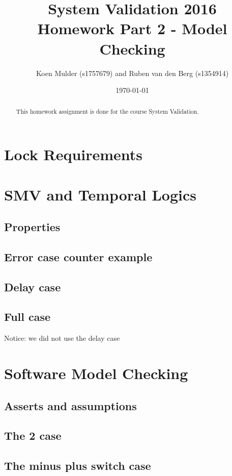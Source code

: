 \documentclass[a4paper]{article}
\title{System Validation 2016 \\ Homework Part 2 - Model Checking}
\author{Koen Mulder (s1757679) and Ruben van den Berg (s1354914)}
\date{\today}
\begin{document}
	\maketitle
	
	\begin{abstract}
		This homework assignment is done for the course System Validation. 
	\end{abstract}
	
	\section{Lock Requirements}

	
	\section{SMV and Temporal Logics}
	
	
	\subsection{Properties}
	
	
	\subsection{Error case counter example}
	
	
	\subsection{Delay case}
	
	
	\subsection{Full case}
	Notice: we did not use the delay case
	

	\section{Software Model Checking}


	\subsection{Asserts and assumptions}
	
	
	\subsection{The 2 case}
	
	
	\subsection{The minus plus switch case}
	
	
	
\end{document}

